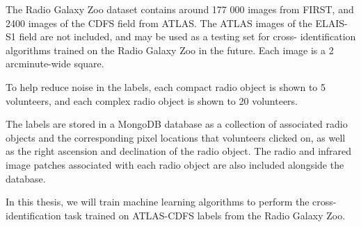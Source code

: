     The Radio Galaxy Zoo dataset contains around 177 000 images from FIRST, and
    2400 images of the CDFS field from ATLAS. The ATLAS images of the ELAIS-S1
    field are not included, and may be used as a testing set for cross-
    identification algorithms trained on the Radio Galaxy Zoo in the future. Each image is a 2 arcminute-wide square.

    To help reduce noise in the labels, each compact radio object is shown to 5
    volunteers, and each complex radio object is shown to 20 volunteers.

    The labels are stored in a MongoDB database as a collection of associated
    radio objects and the corresponding pixel locations that volunteers clicked
    on, as well as the right ascension and declination of the radio object. The
    radio and infrared image patches associated with each radio object are also
    included alongside the database.

    In this thesis, we will train machine learning algorithms to perform the
    cross-identification task trained on ATLAS-CDFS labels from the Radio Galaxy
    Zoo.



